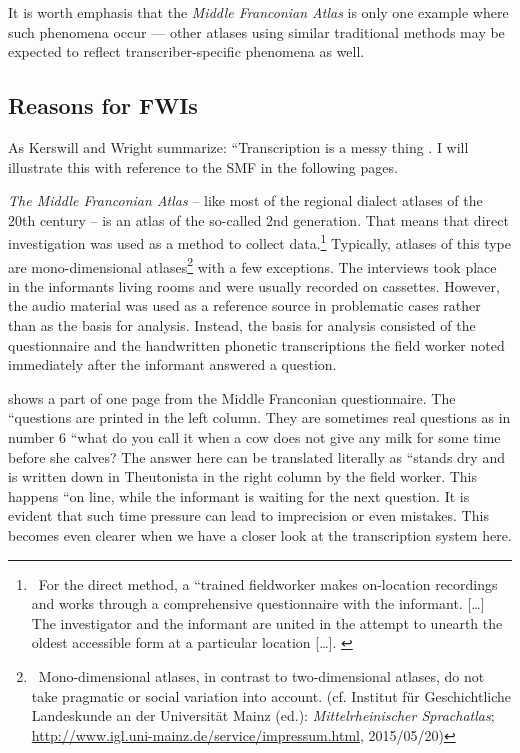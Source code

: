 \documentclass[output=paper]{LSP/langsci}
\begin{document}
It is worth emphasis that the \textit{Middle Franconian Atlas} is only one example where such phenomena occur — other atlases using similar traditional methods may be expected to reflect transcriber-specific phenomena as well.

\subsection{Reasons for FWIs}
As Kerswill and Wright summarize: ``Transcription is a messy thing{\textquotedbl} \citep[273]{kerswill_limits_1990}. I will illustrate this with reference to the SMF in the following pages.

\textit{The Middle Franconian Atlas} – like most of the regional dialect atlases of the 20th century – is an atlas of the so-called 2nd generation. That means that direct investigation was used as a method to collect data.\footnote{\ For the direct method, a ``trained fieldworker makes on-location recordings and works through a comprehensive questionnaire with the informant. […] The investigator and the informant are united in the attempt to unearth the oldest accessible form at a particular location […].{\textquotedbl} \citep[502]{konig_investigating_2010}} Typically, atlases of this type are mono-dimensional atlases\footnote{\ Mono-dimensional atlases, in contrast to two-dimensional atlases, do not take pragmatic or social variation into account. (cf. \citealt{bellmann_mittelrheinischer_????} Institut für Geschichtliche Landeskunde an der Universität Mainz (ed.): \textit{Mittelrheinischer Sprachatlas}; \url{http://www.igl.uni-mainz.de/service/impressum.html}, 2015/05/20)} with a few exceptions. The interviews took place in the informants{\textquotesingle} living rooms and were usually recorded on cassettes. However, the audio material was used as a reference source in problematic cases rather than as the basis for analysis. Instead, the basis for analysis consisted of the questionnaire and the handwritten phonetic transcriptions the field worker noted immediately after the informant answered a question.

 shows a part of one page from the Middle Franconian questionnaire. The ``questions{\textquotedbl} are printed in the left column. They are sometimes real questions as in number 6 ``what do you call it when a cow does not give any milk for some time before she calves?{\textquotedbl} The answer here can be translated literally as ``stands dry{\textquotedbl} and is written down in Theutonista in the right column by the field worker. This happens  ``on line{\textquotedbl}, while the informant is waiting for the next question. It is evident that such time pressure can lead to imprecision or even mistakes. This becomes even clearer when we have a closer look at the transcription system here.
\end{document}
